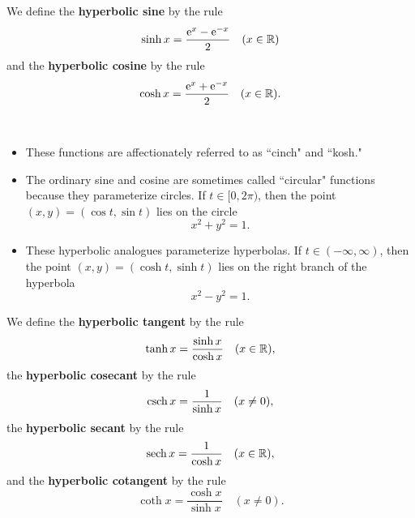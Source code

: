 

\begin{definition}
We define the \textbf{hyperbolic sine} by the rule
\begin{equation*}
\sinh x = \frac{\mathrm{e}^x-\mathrm{e}^{-x}}{2} \quad (x\in\mathbb R)
\end{equation*}
and the \textbf{hyperbolic cosine} by the rule
\begin{equation*}
\cosh x = \frac{\mathrm{e}^x+\mathrm{e}^{-x}}{2} \quad (x\in\mathbb R).
\end{equation*}
\end{definition}

\begin{remark}\,
\begin{itemize}
\item These functions are affectionately referred to as ``cinch" and ``kosh."
\item The ordinary sine and cosine are sometimes called ``circular" functions because they parameterize circles.
If $t\in [0,2\pi)$, then the point $(x,y) = (\cos t, \sin t)$ lies on the circle
\begin{equation*}
x^2+y^2=1.
\end{equation*}
\item These hyperbolic analogues parameterize hyperbolas.
If $t\in (-\infty,\infty)$, then the point $(x,y)=(\cosh t, \sinh t)$ lies on the right branch of the hyperbola
\begin{equation*}
x^2-y^2=1.
\end{equation*}
\end{itemize}
\end{remark}

\begin{definition}
We define the \textbf{hyperbolic tangent} by the rule
\begin{equation*}
\tanh x = \frac{\sinh x}{\cosh x} \quad (x\in \mathbb R),
\end{equation*}
the \textbf{hyperbolic cosecant} by the rule
\begin{equation*}
\operatorname{csch} x = \frac{1}{\sinh x} \quad (x\ne 0),
\end{equation*}
the \textbf{hyperbolic secant} by the rule
\begin{equation*}
\operatorname{sech} x = \frac{1}{\cosh x} \quad (x\in\mathbb R),
\end{equation*}
and the \textbf{hyperbolic cotangent} by the rule
\begin{equation*}
\coth x = \frac{\cosh x}{\sinh x} \quad (x\ne 0).
\end{equation*}
\end{definition}

